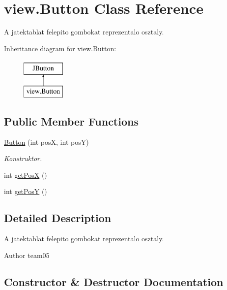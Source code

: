 \hypertarget{classview_1_1_button}{}\section{view.\+Button Class Reference}
\label{classview_1_1_button}


A jatektablat felepito gombokat reprezentalo osztaly.  


Inheritance diagram for view.\+Button\+:\begin{figure}[H]
\begin{center}
\leavevmode
\includegraphics[height=2.000000cm]{classview_1_1_button}
\end{center}
\end{figure}
\subsection*{Public Member Functions}
\begin{DoxyCompactItemize}
\item 
\hyperlink{classview_1_1_button_a3298559ee6a99724b641f6e743027a60}{Button} (int pos\+X, int pos\+Y)
\begin{DoxyCompactList}\small\item\em Konstruktor. \end{DoxyCompactList}\item 
int \hyperlink{classview_1_1_button_ab3134b4be47315c6778c2b9afa515cf1}{get\+Pos\+X} ()
\item 
int \hyperlink{classview_1_1_button_a92639a0395cf98c55f83a570afb9a6c0}{get\+Pos\+Y} ()
\end{DoxyCompactItemize}


\subsection{Detailed Description}
A jatektablat felepito gombokat reprezentalo osztaly. 

\begin{DoxyAuthor}{Author}
team05 
\end{DoxyAuthor}


\subsection{Constructor \& Destructor Documentation}
\hypertarget{classview_1_1_button_a3298559ee6a99724b641f6e743027a60}{}
